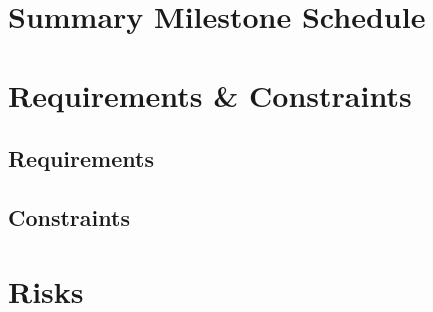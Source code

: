 \documentclass[12pt]{charter}
\begin{document}
\section*{Summary Milestone Schedule}
\label{sec:milestones}

\section*{Requirements \& Constraints}
\label{sec:require-n-constrain}
	\subsection*{Requirements}
	\label{subsec:requirements}
	
	\subsection*{Constraints}
	\label{subsec:constraints}

\section*{Risks}
\label{sec:risks}

\approvalsignature
\end{document}
